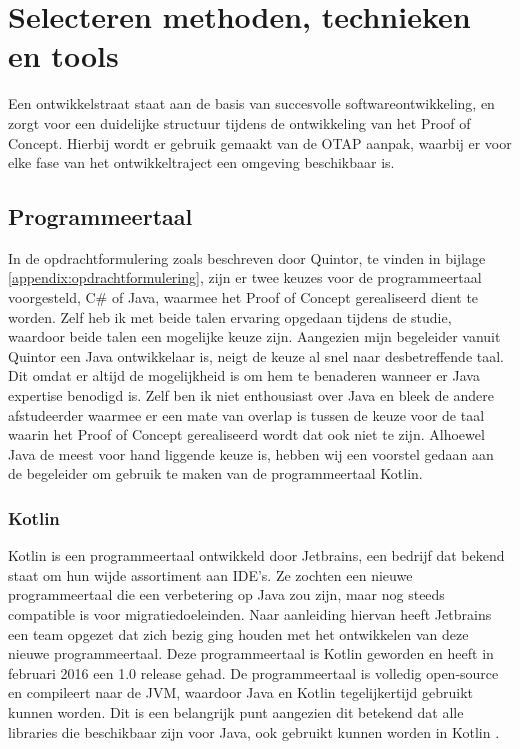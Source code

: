 \section{Selecteren methoden, technieken en tools}

Een ontwikkelstraat staat aan de basis van succesvolle softwareontwikkeling, en zorgt voor een duidelijke structuur tijdens de ontwikkeling van het Proof of Concept. Hierbij wordt er gebruik gemaakt van de \gls{OTAP} aanpak, waarbij er voor elke fase van het ontwikkeltraject een omgeving beschikbaar is.

\subsection{Programmeertaal}

In de opdrachtformulering zoals beschreven door Quintor, te vinden in bijlage \ref{appendix:opdrachtformulering}, zijn er twee keuzes voor de programmeertaal voorgesteld, C\# of Java, waarmee het Proof of Concept gerealiseerd dient te worden. Zelf heb ik met beide talen ervaring opgedaan tijdens de studie, waardoor beide talen een mogelijke keuze zijn. Aangezien mijn begeleider vanuit Quintor een Java ontwikkelaar is, neigt de keuze al snel naar desbetreffende taal. Dit omdat er altijd de mogelijkheid is om hem te benaderen wanneer er Java expertise benodigd is. Zelf ben ik niet enthousiast over Java en bleek de andere afstudeerder waarmee er een mate van overlap is tussen de keuze voor de taal waarin het Proof of Concept gerealiseerd wordt dat ook niet te zijn. Alhoewel Java de meest voor hand liggende keuze is, hebben wij een voorstel gedaan aan de begeleider om gebruik te maken van de programmeertaal Kotlin.

\subsubsection{Kotlin}

Kotlin is een programmeertaal ontwikkeld door Jetbrains, een bedrijf dat bekend staat om hun wijde assortiment aan \acrfull{IDE}'s. Ze zochten een nieuwe programmeertaal die een verbetering op Java zou zijn, maar nog steeds compatible is voor migratiedoeleinden. Naar aanleiding hiervan heeft Jetbrains een team opgezet dat zich bezig ging houden met het ontwikkelen van deze nieuwe programmeertaal. Deze programmeertaal is Kotlin geworden en heeft in februari 2016 een 1.0 release gehad. De programmeertaal is volledig open-source en compileert naar de \acrfull{JVM}, waardoor Java en Kotlin tegelijkertijd gebruikt kunnen worden. Dit is een belangrijk punt aangezien dit betekend dat alle libraries die beschikbaar zijn voor Java, ook gebruikt kunnen worden in Kotlin \citep{mediaan_kotlin}.

